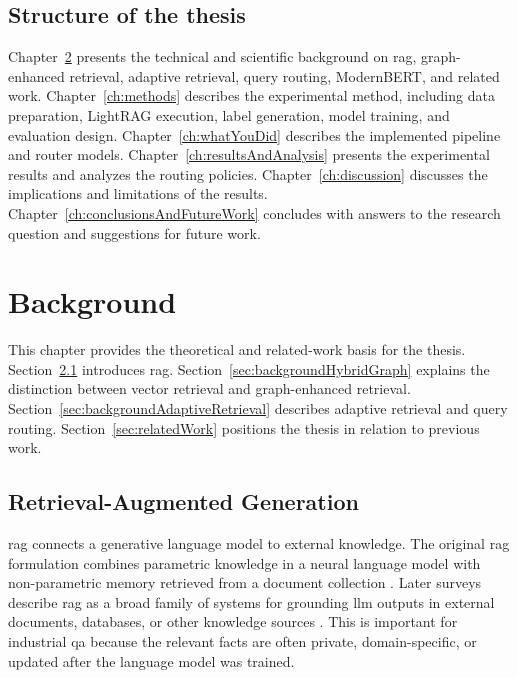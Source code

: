 \documentclass[english, bibtex]{kththesis}               %
\numberwithin{listing}{chapter}
\begin{document}
\section{Structure of the thesis}
\label{sec:structure}

Chapter~\ref{ch:background} presents the technical and scientific background on \gls{rag}, graph-enhanced retrieval, adaptive retrieval, query routing, ModernBERT, and related work. Chapter~\ref{ch:methods} describes the experimental method, including data preparation, LightRAG execution, label generation, model training, and evaluation design. Chapter~\ref{ch:whatYouDid} describes the implemented pipeline and router models. Chapter~\ref{ch:resultsAndAnalysis} presents the experimental results and analyzes the routing policies. Chapter~\ref{ch:discussion} discusses the implications and limitations of the results. Chapter~\ref{ch:conclusionsAndFutureWork} concludes with answers to the research question and suggestions for future work.

\cleardoublepage
\chapter{Background}
\label{ch:background}
This chapter provides the theoretical and related-work basis for the thesis. Section~\ref{sec:backgroundRag} introduces \gls{rag}. Section~\ref{sec:backgroundHybridGraph} explains the distinction between vector retrieval and graph-enhanced retrieval. Section~\ref{sec:backgroundAdaptiveRetrieval} describes adaptive retrieval and query routing. Section~\ref{sec:relatedWork} positions the thesis in relation to previous work.

\section{Retrieval-Augmented Generation}
\label{sec:backgroundRag}

\Gls{rag} connects a generative language model to external knowledge. The original \gls{rag} formulation combines parametric knowledge in a neural language model with non-parametric memory retrieved from a document collection \cite{lewis2020rag}. Later surveys describe \gls{rag} as a broad family of systems for grounding \gls{llm} outputs in external documents, databases, or other knowledge sources \cite{gao2023ragsurvey}. This is important for industrial \gls{qa} because the relevant facts are often private, domain-specific, or updated after the language model was trained.
\end{document}
